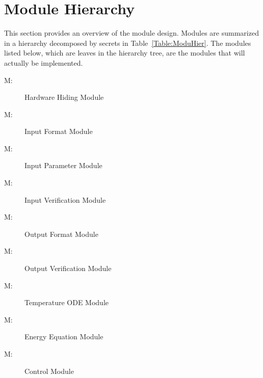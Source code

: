 \documentclass[12pt]{article}
\newcounter{modnum}
\newcommand{\mthemodnum}{M\themodnum}
\begin{document}
\section{Module Hierarchy}
\label{Sec:ModuHier}
This section provides an overview of the module design. Modules are summarized in a hierarchy decomposed by secrets in Table~\ref{Table:ModuHier}. The modules listed below, which are leaves in the hierarchy tree, are the modules that will actually be implemented.
\begin{description}
\item[\mthemodnum\label{M:hwHiding}:]Hardware Hiding Module
\end{description}
\begin{description}
\item[\mthemodnum\label{M:modInputFormat}:]Input Format Module
\end{description}
\begin{description}
\item[\mthemodnum\label{M:modInputParam}:]Input Parameter Module
\end{description}
\begin{description}
\item[\mthemodnum\label{M:modInputVerif}:]Input Verification Module
\end{description}
\begin{description}
\item[\mthemodnum\label{M:modoutputfdesc}:]Output Format Module
\end{description}
\begin{description}
\item[\mthemodnum\label{M:modoutputvdesc}:]Output Verification Module
\end{description}
\begin{description}
\item[\mthemodnum\label{M:modtempdesc}:]Temperature ODE Module
\end{description}
\begin{description}
\item[\mthemodnum\label{M:modenerdesc}:]Energy Equation Module
\end{description}
\begin{description}
\item[\mthemodnum\label{M:modControl}:]Control Module
\end{description}
\end{document}
